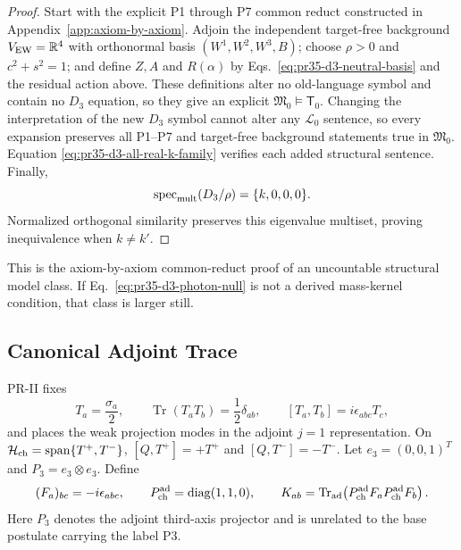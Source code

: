 \begin{proof}
Start with the explicit P1 through P7 common reduct constructed in Appendix~\ref{app:axiom-by-axiom}.  Adjoin the independent target-free
background $V_{\rm EW}=\mathbb R^4$ with orthonormal basis $(W^1,W^2,W^3,B)$; choose $\rho>0$ and $c^2+s^2=1$; and define $Z,A$ and $R(\alpha)$ by Eqs.~\eqref{eq:pr35-d3-neutral-basis} and the residual action above.  These definitions alter no old-language symbol and contain no $D_3$ equation, so they give an explicit $\mathfrak M_0\models\mathsf T_0$. Changing the interpretation of the new $D_3$ symbol cannot alter any $\mathcal L_0$ sentence, so every expansion preserves all P1--P7 and target-free background statements true in $\mathfrak M_0$.  Equation \eqref{eq:pr35-d3-all-real-k-family} verifies each added structural sentence.
Finally,
\begin{equation}
 \operatorname{spec}_{\rm mult}(D_3/\rho)=\{k,0,0,0\}.
\end{equation}
Normalized orthogonal similarity preserves this eigenvalue multiset, proving
inequivalence when $k\ne k'$.
\end{proof}

This is the axiom-by-axiom common-reduct proof of an uncountable structural
model class.  If Eq.~\eqref{eq:pr35-d3-photon-null} is not a derived
mass-kernel condition, that class is larger still.

\subsection{Canonical Adjoint Trace}

PR-II fixes \cite{PRII}
\begin{equation}
 T_a=\frac{\sigma_a}{2},\qquad
 \operatorname{Tr}(T_aT_b)=\frac12\delta_{ab},\qquad
 [T_a,T_b]=i\epsilon_{abc}T_c,
 \label{eq:pr35-d3-prii-normalization}
\end{equation}
and places the weak projection modes in the adjoint $j=1$ representation.
On $\mathcal H_{\rm ch}=\operatorname{span}\{T^+,T^-\}$,
$[Q,T^+]=+T^+$ and $[Q,T^-]=-T^-$.  Let $e_3=(0,0,1)^T$ and
$P_3=e_3\otimes e_3$.  Define
\begin{equation}
 (F_a)_{bc}=-i\epsilon_{abc},\qquad
 P_{\rm ch}^{\rm ad}=\operatorname{diag}(1,1,0),\qquad
 K_{ab}=\operatorname{Tr}_{\rm ad}
 \!\left(P_{\rm ch}^{\rm ad}F_aP_{\rm ch}^{\rm ad}F_b\right).
 \label{eq:pr35-d3-projected-tensor}
\end{equation}
Here $P_3$ denotes the adjoint third-axis projector and is unrelated to the
base postulate carrying the label P3.

